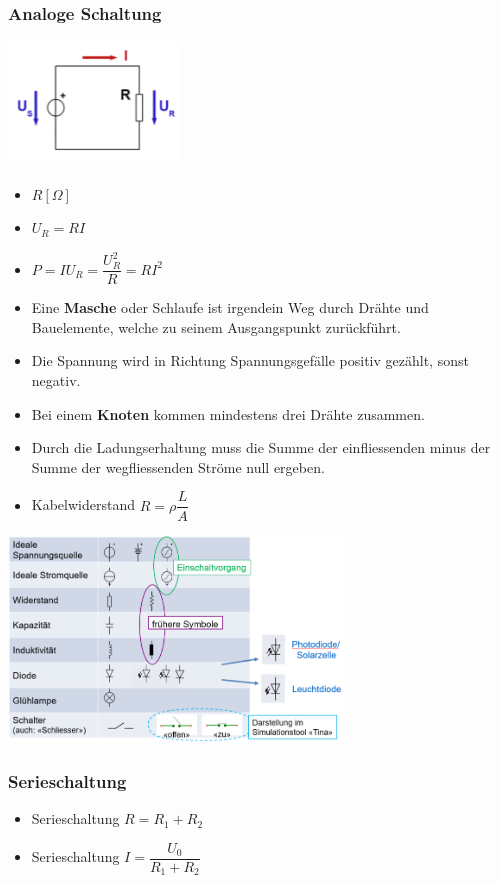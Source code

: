 \documentclass[8pt,a4paper]{scrartcl}
\begin{document}
\begin{multicols*}{3}
			\subsubsection{Analoge Schaltung}
				\begin{multicols*}{2}		
					\includegraphics[height=3.3cm]{img/schaltung.png}
					\begin{itemize}\itemsep0pt				
						\item $R[\Omega]$
						\item $U_{R}=RI$
						\item $P=IU_{R}=\dfrac{U_{R}^{2}}{R}=RI^{2}$
					\end{itemize}
				\end{multicols*}
				\begin{itemize}\itemsep0pt
					\item Eine \textbf{Masche} oder Schlaufe ist irgendein Weg durch Drähte und Bauelemente, welche zu seinem Ausgangspunkt zurückführt.
					\item Die Spannung wird in Richtung Spannungsgefälle positiv gezählt, sonst negativ.
					\item Bei einem \textbf{Knoten} kommen mindestens drei Drähte zusammen.
					\item Durch die Ladungserhaltung muss die Summe der einfliessenden minus der Summe der wegfliessenden Ströme null ergeben.
					\item Kabelwiderstand $R = \rho\dfrac{L}{A}$							\end{itemize}			
				\includegraphics[height=5.5cm]{img/schaltung2.png}	
				\subsubsection{Serieschaltung}	
					\begin{itemize}\itemsep0pt
						\item Serieschaltung $R = R_{1} + R_{2}$
						\item Serieschaltung $I = \dfrac{U_{0}}{R_{1} + R_{2}}$
					\end{itemize}

\end{multicols*}
\end{document}
